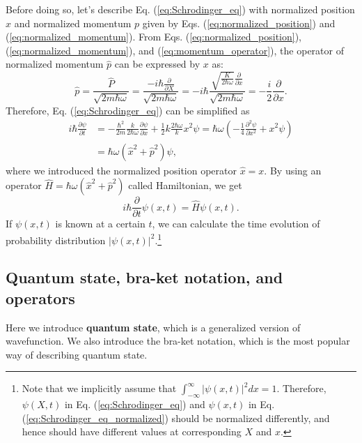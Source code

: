 \documentclass{book}
\begin{document}
Before doing so, let's describe Eq. (\ref{eq:Schrodinger_eq}) with normalized position $x$ and normalized momentum $p$ given by Eqs. (\ref{eq:normalized_position}) and (\ref{eq:normalized_momentum}). From Eqs. (\ref{eq:normalized_position}), (\ref{eq:normalized_momentum}), and (\ref{eq:momentum_operator}), the operator of normalized momentum $\hat p$ can be expressed by $x$ as:
\begin{equation}
  \hat p = \frac{\hat P}{\sqrt{2m\hbar \omega}} = \frac{-i\hbar \frac{\partial}{\partial X}}{\sqrt{2m\hbar \omega}}
  =-i\hbar \frac{\sqrt{\frac{K}{2\hbar\omega}}\frac{\partial}{\partial x}}{\sqrt{2m\hbar \omega}} = -\frac{i}{2}\frac{\partial}{\partial x}.
\end{equation}
Therefore, Eq. (\ref{eq:Schrodinger_eq}) can be simplified as
\begin{equation}
\begin{aligned}
  i\hbar \frac{\partial \psi}{\partial t} &= -\frac{\hbar^2}{2m}\frac{k}{2\hbar \omega}\frac{\partial \psi}{\partial x} + \frac 1 2 k \frac{2\hbar \omega}{k}x^2 \psi = \hbar \omega \left( -\frac 1 4 \frac{\partial^2\psi}{\partial x^2} + x^2 \psi\right)\\
  &= \hbar \omega (\hat x^2 + \hat p^2)\psi,
  \label{eq:Schrodinger_eq_normalized}
\end{aligned}
\end{equation}
where we introduced the normalized position operator $\hat x = x$. By using an operator $\hat H = \hbar \omega (\hat x^2 + \hat p^2)$ called Hamiltonian, we get
\begin{equation}
  i\hbar \frac{\partial}{\partial t}\psi(x,t) = \hat H\psi(x,t).
\end{equation}
If $\psi(x,t)$ is known at a certain $t$, we can calculate the time evolution of probability distribution $|\psi(x,t)|^2$.\footnote{Note that we implicitly assume that $\int_{-\infty}^{\infty}|\psi(x,t)|^2dx = 1$. Therefore, $\psi(X, t)$ in Eq. (\ref{eq:Schrodinger_eq}) and $\psi(x,t)$ in Eq. (\ref{eq:Schrodinger_eq_normalized}) should be normalized differently, and hence should have different values at corresponding $X$ and $x$.}

\subsection{Quantum state, bra-ket notation, and operators}

Here we introduce \textbf{quantum state}, which is a generalized version of wavefunction. We also introduce the bra-ket notation, which is the most popular way of describing quantum state. 
\end{document}
